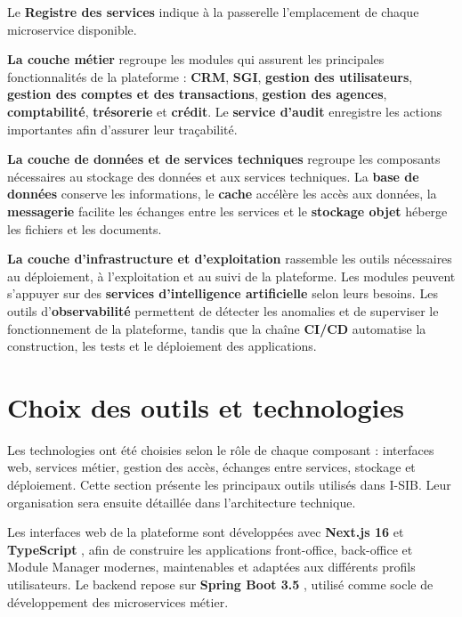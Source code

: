 Le \textbf{Registre des services} indique à la passerelle l'emplacement de chaque microservice disponible.

\medskip

\textbf{La couche métier} regroupe les modules qui assurent les principales fonctionnalités de la plateforme : \textbf{CRM}, \textbf{SGI}, \textbf{gestion des utilisateurs}, \textbf{gestion des comptes et des transactions}, \textbf{gestion des agences}, \textbf{comptabilité}, \textbf{trésorerie} et \textbf{crédit}. Le \textbf{service d'audit} enregistre les actions importantes afin d'assurer leur traçabilité.

\medskip

\textbf{La couche de données et de services techniques} regroupe les composants nécessaires au stockage des données et aux services techniques. La \textbf{base de données} conserve les informations, le \textbf{cache} accélère les accès aux données, la \textbf{messagerie} facilite les échanges entre les services et le \textbf{stockage objet} héberge les fichiers et les documents.

\medskip

\textbf{La couche d'infrastructure et d'exploitation} rassemble les outils nécessaires au déploiement, à l'exploitation et au suivi de la plateforme. Les modules peuvent s'appuyer sur des \textbf{services d'intelligence artificielle} selon leurs besoins. Les outils d'\textbf{observabilité} permettent de détecter les anomalies et de superviser le fonctionnement de la plateforme, tandis que la chaîne \textbf{CI/CD} automatise la construction, les tests et le déploiement des applications.



\section{Choix des outils et technologies}

Les technologies ont été choisies selon le rôle de chaque composant :
interfaces web, services métier, gestion des accès, échanges entre services,
stockage et déploiement. Cette section présente les principaux outils utilisés
dans I-SIB. Leur organisation sera ensuite détaillée dans l'architecture
technique.

Les interfaces web de la plateforme sont développées avec \textbf{Next.js 16}
\cite{nextjs_docs} et \textbf{TypeScript} \cite{typescript_docs}, afin de construire les applications front-office, back-office et Module Manager
modernes, maintenables et adaptées aux différents profils utilisateurs. Le backend repose
sur \textbf{Spring Boot 3.5} \cite{spring_boot_docs}, utilisé comme socle de développement des microservices
métier.

